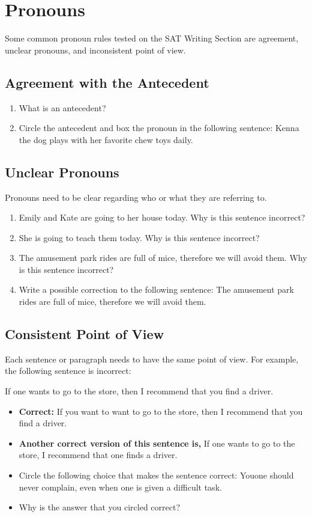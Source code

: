 \section{Pronouns}
Some common pronoun rules tested on the SAT Writing Section are agreement, unclear pronouns,
and inconsistent point of view.

\subsection{Agreement with the Antecedent}
\begin{enumerate}
\item{What is an antecedent?} \hrulefill
\item{Circle the antecedent and box the pronoun in the following sentence: Kenna the dog plays
with her favorite chew toys daily.}

\end{enumerate} 

\subsection{Unclear Pronouns}
Pronouns need to be clear regarding who or what they are referring to.
\begin{enumerate}
\item{Emily and Kate are going to her house today. Why is this sentence incorrect?} \hrulefill
\item{She is going to teach them today. Why is this sentence incorrect?} \hrulefill
\item{The amusement park rides are full of mice, therefore we will avoid them. Why is this sentence
incorrect?} \hrulefill
\item{Write a possible correction to the following sentence: The amusement park rides are full of
mice, therefore we will avoid them.} \hrulefill
\end{enumerate}

\subsection{Consistent Point of View}
Each sentence or paragraph needs to have the same point of view. For example, the following
sentence is incorrect: 

\bigskip
If one wants to go to the store, then I recommend that you find a driver.

\begin{itemize}
\item{\textbf{Correct:} If you want to want to go to the store, then I recommend that you find a driver.}
\item{\textbf{Another correct version of this sentence is,} If one wants to go to the store, I recommend that
one finds a driver.}
\item{Circle the following choice that makes the sentence correct: You\/one should never complain, even when one is given a difficult task.}
\item{Why is the answer that you circled correct?} \hrulefill
\end{itemize}